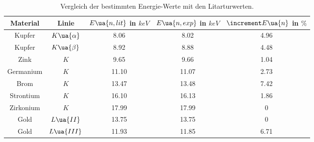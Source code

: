 \begin{table}
  \centering
  \caption{Vergleich der bestimmten Energie-Werte mit den Litarturwerten.\cite{anleitung02}}
  \label{tab:DiskussionEnergie}
  \begin{tabular}{c c c c c }
    \toprule
    Material & Linie & $E\ua{n,lit}$ in $\si{keV}$ & $E\ua{n,exp}$ in $\si{keV}$
    & $\increment E\ua{n}$ in $\%$ \\
    \midrule
    Kupfer     & $K\ua{\alpha}$ &  8.06 &  8.02 & 4.96  \\
    Kupfer     & $K\ua{\beta}$  &  8.92 &  8.88 & 4.48  \\
    Zink       & $K$            &  9.65 &  9.66 & 1.04  \\
    Germanium  & $K$            & 11.10 & 11.07 & 2.73  \\
    Brom       & $K$            & 13.47 & 13.48 & 7.42  \\
    Strontium  & $K$            & 16.10 & 16.13 & 1.86  \\
    Zirkonium  & $K$            & 17.99 & 17.99 & 0  \\
    Gold       & $L\ua{II}$     & 13.75 & 13.75 & 0  \\
    Gold       & $L\ua{III}$    & 11.93 & 11.85 & 6.71  \\
  \end{tabular}
\end{table}
